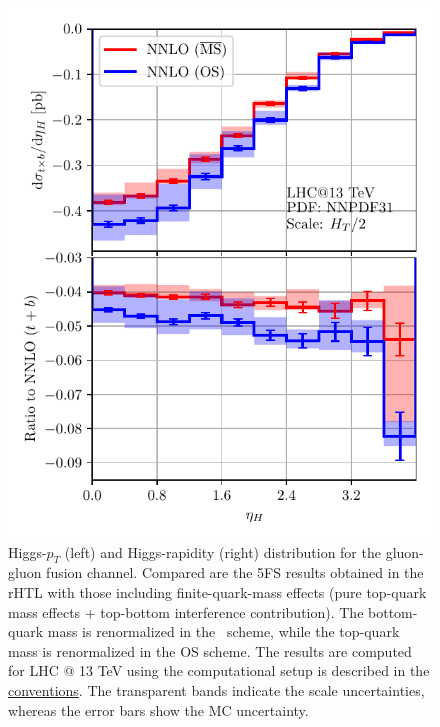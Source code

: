 \begin{figure}[h]
\begin{minipage}[t]{0.49\textwidth}
  \includegraphics[width=\textwidth]{Images/yH_MS_OS_comparison_13000.pdf}
\end{minipage}
\caption{Higgs-$p_T$ (left) and Higgs-rapidity (right) distribution for the gluon-gluon fusion channel. Compared are the 5\acs{FS} results obtained in the \acs{rHTL} with those including finite-quark-mass effects (pure top-quark mass effects + top-bottom interference contribution). The bottom-quark mass is renormalized in the \MS\ scheme, while the top-quark mass is renormalized in the \acs{OS} scheme. The results are computed for LHC @ 13 TeV using the computational setup is described in the \hyperref[chap:notation_and_conventions]{conventions}. The transparent bands indicate the scale uncertainties, whereas the error bars show the \acs{MC} uncertainty.}
\label{fig:6:pT_yH_OS_MS_comparison}
\end{figure}
%
